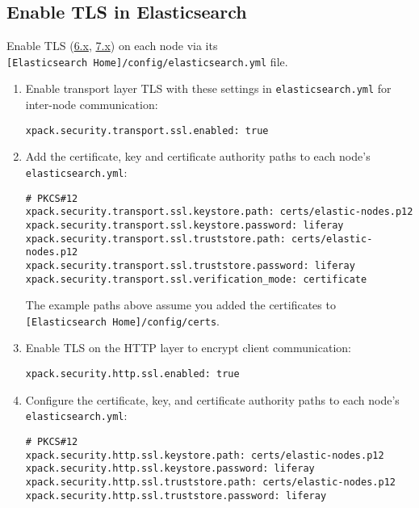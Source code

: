 \subsection{Enable TLS in
Elasticsearch}\label{enable-tls-in-elasticsearch}

Enable TLS
(\href{https://www.elastic.co/guide/en/elasticsearch/reference/6.x/configuring-tls.html\#enable-ssl}{6.x},
\href{https://www.elastic.co/guide/en/elasticsearch/reference/7.x/configuring-tls.html}{7.x})
on each node via its
\texttt{{[}Elasticsearch\ Home{]}/config/elasticsearch.yml} file.

\begin{enumerate}
\def\labelenumi{\arabic{enumi}.}
\item
  Enable transport layer TLS with these settings in
  \texttt{elasticsearch.yml} for inter-node communication:

\begin{verbatim}
xpack.security.transport.ssl.enabled: true
\end{verbatim}
\item
  Add the certificate, key and certificate authority paths to each
  node's \texttt{elasticsearch.yml}:

\begin{verbatim}
# PKCS#12
xpack.security.transport.ssl.keystore.path: certs/elastic-nodes.p12
xpack.security.transport.ssl.keystore.password: liferay
xpack.security.transport.ssl.truststore.path: certs/elastic-nodes.p12
xpack.security.transport.ssl.truststore.password: liferay
xpack.security.transport.ssl.verification_mode: certificate
\end{verbatim}

  The example paths above assume you added the certificates to
  \texttt{{[}Elasticsearch\ Home{]}/config/certs}.
\item
  Enable TLS on the HTTP layer to encrypt client communication:

\begin{verbatim}
xpack.security.http.ssl.enabled: true
\end{verbatim}
\item
  Configure the certificate, key, and certificate authority paths to
  each node's \texttt{elasticsearch.yml}:

\begin{verbatim}
# PKCS#12
xpack.security.http.ssl.keystore.path: certs/elastic-nodes.p12
xpack.security.http.ssl.keystore.password: liferay
xpack.security.http.ssl.truststore.path: certs/elastic-nodes.p12
xpack.security.http.ssl.truststore.password: liferay
\end{verbatim}
\end{enumerate}

